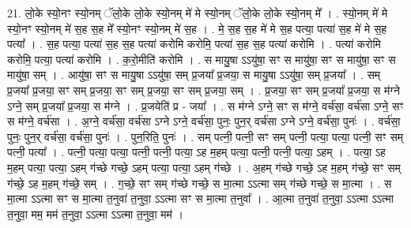 \documentclass[17pt]{extarticle}
\begin{document}
21. लो॒के स्यो॒नꣳ स्यो॒नम् ॅलो॒के लो॒के स्यो॒नम् मे॑ मे स्यो॒नम् ॅलो॒के लो॒के स्यो॒नम् मे᳚ । . स्यो॒नम् मे॑ मे स्यो॒नꣳ स्यो॒नम् मे॑ स॒ह स॒ह मे᳚ स्यो॒नꣳ स्यो॒नम् मे॑ स॒ह । . मे॒ स॒ह स॒ह मे॑ मे स॒ह पत्या॒ पत्या॑ स॒ह मे॑ मे स॒ह पत्या᳚ । . स॒ह पत्या॒ पत्या॑ स॒ह स॒ह पत्या॑ करोमि करोमि॒ पत्या॑ स॒ह स॒ह पत्या॑ करोमि । . पत्या॑ करोमि करोमि॒ पत्या॒ पत्या॑ करोमि । . क॒रो॒मीति॑ करोमि । . स मायु॒षा ऽऽयु॑षा॒ सꣳ स मायु॑षा॒ सꣳ स मायु॑षा॒ सꣳ स मायु॑षा॒ सम् । . आयु॑षा॒ सꣳ स मायु॒षा ऽऽयु॑षा॒ सम् प्र॒जया᳚ प्र॒जया॒ स मायु॒षा ऽऽयु॑षा॒ सम् प्र॒जया᳚ । . सम् प्र॒जया᳚ प्र॒जया॒ सꣳ सम् प्र॒जया॒ सꣳ सम् प्र॒जया॒ सꣳ सम् प्र॒जया॒ सम् । . प्र॒जया॒ सꣳ सम् प्र॒जया᳚ प्र॒जया॒ स म॑ग्ने ऽग्ने॒ सम् प्र॒जया᳚ प्र॒जया॒ स म॑ग्ने । . प्र॒जयेति॑ प्र - जया᳚ । . स म॑ग्ने ऽग्ने॒ सꣳ स म॑ग्ने॒ वर्च॑सा॒ वर्च॑सा ऽग्ने॒ सꣳ स म॑ग्ने॒ वर्च॑सा । . अ॒ग्ने॒ वर्च॑सा॒ वर्च॑सा ऽग्ने ऽग्ने॒ वर्च॑सा॒ पुनः॒ पुन॒र् वर्च॑सा ऽग्ने ऽग्ने॒ वर्च॑सा॒ पुनः॑ । . वर्च॑सा॒ पुनः॒ पुन॒र् वर्च॑सा॒ वर्च॑सा॒ पुनः॑ । . पुन॒रिति॒ पुनः॑ । . सम् पत्नी॒ पत्नी॒ सꣳ सम् पत्नी॒ पत्या॒ पत्या॒ पत्नी॒ सꣳ सम् पत्नी॒ पत्या᳚ । . पत्नी॒ पत्या॒ पत्या॒ पत्नी॒ पत्नी॒ पत्या॒ ऽह म॒हम् पत्या॒ पत्नी॒ पत्नी॒ पत्या॒ ऽहम् । . पत्या॒ ऽह म॒हम् पत्या॒ पत्या॒ ऽहम् ग॑च्छे गच्छे॒ ऽहम् पत्या॒ पत्या॒ ऽहम् ग॑च्छे । . अ॒हम् ग॑च्छे गच्छे॒ ऽह म॒हम् ग॑च्छे॒ सꣳ सम् ग॑च्छे॒ ऽह म॒हम् ग॑च्छे॒ सम् । . ग॒च्छे॒ सꣳ सम् ग॑च्छे गच्छे॒ स मा॒त्मा ऽऽत्मा सम् ग॑च्छे गच्छे॒ स मा॒त्मा । . स मा॒त्मा ऽऽत्मा सꣳ स मा॒त्मा त॒नुवा॑ त॒नुवा॒ ऽऽत्मा सꣳ स मा॒त्मा त॒नुवा᳚ । . आ॒त्मा त॒नुवा॑ त॒नुवा॒ ऽऽत्मा ऽऽत्मा त॒नुवा॒ मम॒ मम॑ त॒नुवा॒ ऽऽत्मा ऽऽत्मा त॒नुवा॒ मम॑ । \newline
\end{document}
